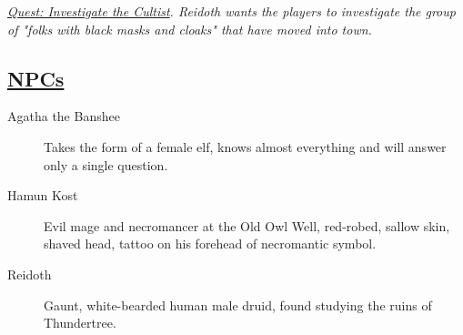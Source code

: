 \emph{\underline{Quest: Investigate the Cultist}. Reidoth wants the players to investigate the group of "folks with black masks and cloaks" that have moved into town. }

\subsection{\underline{NPCs}}
\begin{description}
	\item[Agatha the Banshee] Takes the form of a female elf, knows almost everything and will answer only a single question.
	\item[Hamun Kost] Evil mage and necromancer at the Old Owl Well, red-robed, sallow skin, shaved head, tattoo on his forehead of necromantic symbol.
	\item[Reidoth] Gaunt, white-bearded human male druid, found studying the ruins of Thundertree.
\end{description}